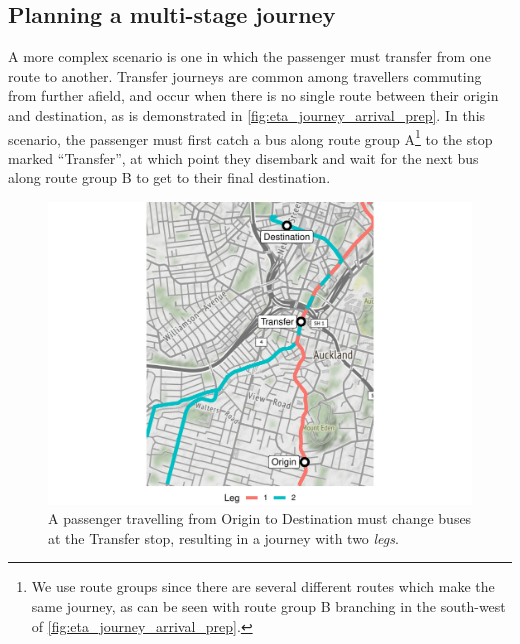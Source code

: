 \subsection{Planning a multi-stage journey}
\label{sec:journey_transfer}

A more complex scenario is one in which the passenger must transfer from one route to another. Transfer journeys are common among travellers commuting from further afield, and occur when there is no single route between their origin and destination, as is demonstrated in \cref{fig:eta_journey_arrival_prep}. In this scenario, the passenger must first catch a bus along route group A\footnote{We use route groups since there are several different routes which make the same journey, as can be seen with route group B branching in the south-west of \cref{fig:eta_journey_arrival_prep}.} to the stop marked ``Transfer'', at which point they disembark and wait for the next bus along route group B to get to their final destination.


\begin{knitrout}\small
{}\color{fgcolor}\begin{figure}

{\centering \includegraphics[width=\textwidth]{figure/eta_journey_transfer_prep-1} 

}

\caption[A transfer journey for a passenger travelling between two locations with no single connecting route.]{A passenger travelling from Origin to Destination must change buses at the Transfer stop, resulting in a journey with two \emph{legs}.}\label{fig:eta_journey_transfer_prep}
\end{figure}


\end{knitrout}




